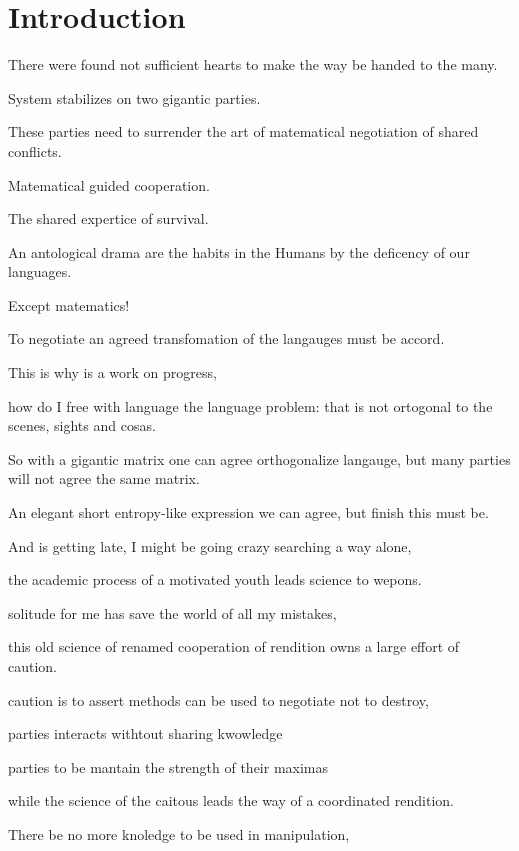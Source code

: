\documentclass[a4paper,fleqn]{cas-sc}
\begin{document}
 \maketitle

\section{Introduction}
There were found not sufficient hearts to make the way be handed to the many. 

System stabilizes on two gigantic parties. 

These parties need to surrender the art of matematical negotiation of shared conflicts. 

Matematical guided cooperation. 

The shared expertice of survival. 

An antological drama are the habits in the Humans by the deficency of our languages. 

Except matematics!

To negotiate an agreed transfomation of the langauges must be accord. 

This is why is a work on progress, 

how do I free with language the language problem: that is not ortogonal to the scenes, sights and cosas. 

So with a gigantic matrix one can agree orthogonalize langauge, but many parties will not agree the same matrix. 

An elegant short entropy-like expression we can agree, but finish this must be. 

And is getting late, I might be going crazy searching a way alone, 

the academic process of a motivated youth leads science to wepons. 

solitude for me has save the world of all my mistakes, 

this old science of renamed cooperation of rendition owns a large effort of caution. 

caution is to assert methods can be used to negotiate not to destroy, 

parties interacts withtout sharing kwowledge 

parties to be mantain the strength of their maximas 

while the science of the caitous leads the way of a coordinated rendition. 

There be no more knoledge to be used in manipulation, 
\end{document}
